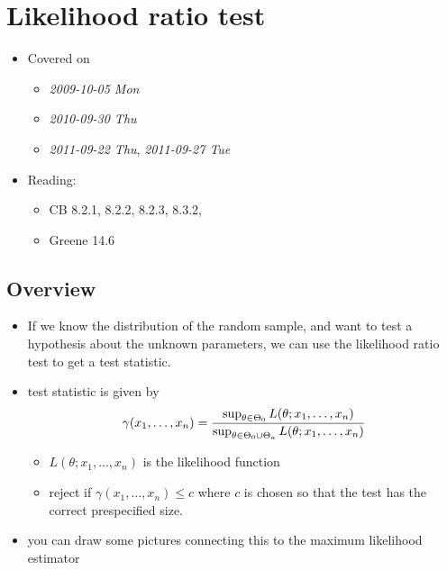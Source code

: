 
\chapter{Likelihood ratio test}

\begin{itemize}
\item Covered on
\begin{itemize}
\item \textit{2009-10-05 Mon}
\item \textit{2010-09-30 Thu}
\item \textit{2011-09-22 Thu}, \textit{2011-09-27 Tue}
\end{itemize}
\item Reading:
\begin{itemize}
\item CB 8.2.1, 8.2.2, 8.2.3, 8.3.2,
\item Greene 14.6
\end{itemize}
\end{itemize}
\section{Overview}
\label{sec-1}

\begin{itemize}
\item If we know the distribution of the random sample, and want to
      test a hypothesis about the unknown parameters, we can use the
      likelihood ratio test to get a test statistic.
\item test statistic is given by
      \[\gamma(x_1,\dots,x_n) = {\sup_{\theta \in \Theta_0} L(\theta;
      x_1,\dots,x_n) \over \sup_{\theta \in \Theta_0 \cup \Theta_a} L(\theta;
      x_1,\dots,x_n)}\]
\begin{itemize}
\item $L(\theta; x_1,\dots,x_n)$ is the likelihood function
\item reject if $\gamma(x_1,\dots,x_n) \leq c$ where $c$ is chosen
        so that the test has the correct prespecified size.
\end{itemize}
\item you can draw some pictures connecting this to the maximum
      likelihood estimator
\end{itemize}
